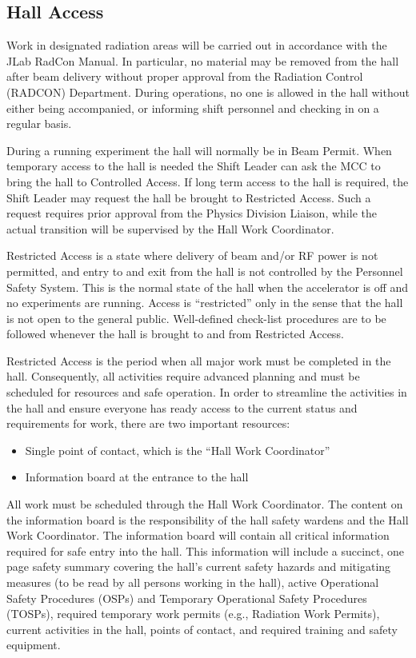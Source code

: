 \documentclass[10pt]{article}
\begin{document}
\subsection{Hall Access}

Work in designated radiation 
areas will be carried out in accordance
with the JLab RadCon Manual. In particular, no material 
may be removed from the hall after beam delivery
without proper approval from
the Radiation Control (RADCON) Department.
During operations, no one is allowed in the hall 
without either being accompanied, or informing shift personnel
and checking in on a regular basis. 
 
During a running experiment the hall will normally be in Beam Permit. When 
temporary access to the hall is needed the Shift Leader can ask the MCC to 
bring the hall to Controlled Access. If long term access to the hall is
required, the Shift Leader may request the hall be brought to Restricted
Access. Such a request requires prior approval from the Physics Division
Liaison, while the actual transition will be supervised by the Hall Work
Coordinator.

Restricted Access is a state where  delivery of beam and/or RF power is not 
permitted, and entry to and exit 
from the hall is not controlled by the Personnel Safety System. This is the 
normal state of the hall when the accelerator is off and no experiments are 
running. Access is ``restricted'' only in the sense that the hall is not open 
to the general public. Well-defined check-list procedures are to
be followed whenever the hall is brought to and from Restricted Access.

Restricted Access is the period when all major work must be completed in the
hall. Consequently, all activities require advanced planning and must be 
scheduled for resources and safe operation. In order to streamline the 
activities in the hall and ensure everyone
has ready access to the current status and requirements for work, there
are two important resources: 
\begin{itemize} 
\item Single point of contact, which is the ``Hall Work Coordinator''
\item Information board at the entrance to the hall
\end{itemize}
All work must be scheduled through the Hall Work Coordinator. The content 
on the information board is the responsibility of the hall safety wardens 
and the Hall Work Coordinator. The information board will contain all critical 
information required for safe entry into the hall. This information will
include a succinct, one page safety summary covering the hall's current
safety hazards and mitigating measures (to be read by all persons working
in the hall), active Operational Safety Procedures (OSPs) and Temporary
Operational Safety Procedures (TOSPs), required temporary work permits 
(e.g., Radiation Work Permits), current activities in the hall, points of 
contact, and required training and safety equipment.
\end{document}
